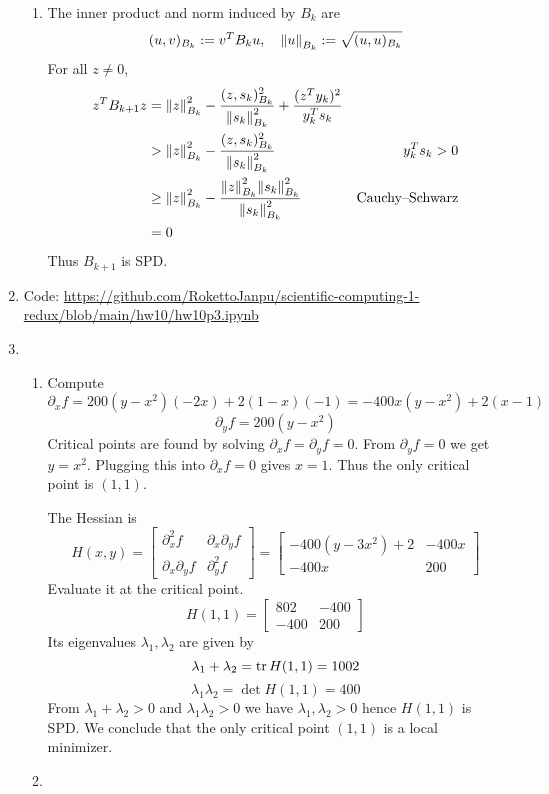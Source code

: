\documentclass{article}
\newcommand{\m}[2][b]{\begin{#1matrix}#2\end{#1matrix}}
\renewcommand{\d}{\partial}
\renewcommand{\l}{\lambda}
\begin{document}
\begin{enumerate}
\begin{enumerate}
		
		
		\item The inner product and norm induced by $B_k$ are
		\[(u,v)_{B_k} := v^TB_ku,
		\quad \norm{u}_{B_k} := \sqrt{(u,u)_{B_k}}\]
		For all $z\ne0$,
		\begin{align*}
			z^TB_{k+1}z &= \norm{z}_{B_k}^2 - \frac{(z,s_k)_{B_k}^2}{\norm{s_k}_{B_k}^2} + \frac{(z^Ty_k)^2}{y_k^Ts_k} \\
			&> \norm{z}_{B_k}^2 - \frac{(z,s_k)_{B_k}^2}{\norm{s_k}_{B_k}^2} & y_k^Ts_k > 0 \\
			&\ge \norm{z}_{B_k}^2 - \frac{\norm{z}_{B_k}^2\norm{s_k}_{B_k}^2}{\norm{s_k}_{B_k}^2} & \text{Cauchy--Schwarz} \\
			&= 0
		\end{align*}
		Thus $B_{k+1}$ is SPD.
		
		
		
	\end{enumerate}



	\pagebreak
	
	
	
	\item Code: \url{https://github.com/RokettoJanpu/scientific-computing-1-redux/blob/main/hw10/hw10p3.ipynb}
	
	
	
	\pagebreak
	
	
	
	\item
	
	\begin{enumerate}
		
		
		
		
		\item Compute
		\[\d_xf = 200(y-x^2)(-2x) + 2(1-x)(-1) = -400x(y-x^2) + 2(x-1)\]
		\[\d_yf = 200(y-x^2)\]
		Critical points are found by solving $\d_xf=\d_yf=0$. From $\d_yf=0$ we get $y=x^2$. Plugging this into $\d_xf=0$ gives $x=1$. Thus the only critical point is $(1,1)$.
		
		The Hessian is
		\[H(x,y) = \m{\d_x^2f & \d_x\d_yf \\ \d_x\d_yf & \d_y^2f} = \m{-400(y-3x^2)+2 & -400x \\ -400x & 200}\]
		Evaluate it at the critical point.
		\[H(1,1) = \m{802 & -400 \\ -400 & 200}\]
		Its eigenvalues $\l_1,\l_2$ are given by
		\[\l_1+\l_2 = \tr H(1,1) = 1002\]
		\[\l_1\l_2 = \det H(1,1) = 400\]
		From $\l_1+\l_2>0$ and $\l_1\l_2>0$ we have $\l_1,\l_2>0$ hence $H(1,1)$ is SPD. We conclude that the only critical point $(1,1)$ is a local minimizer.
		 
		
		
		\item
		
		
		
		
	\end{enumerate}
	
	
	
\end{enumerate}
	
	
	
\end{document}
